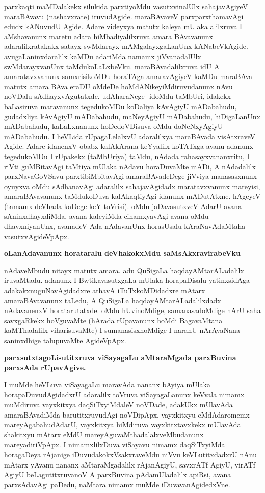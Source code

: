 \noindent
parxkaqti maMDalakekx silukida parxtiyoMdu vasutxvinalUlx sahajavAgiyeV maraBAvavu (nashavxrate) iru\-vudAgide. maraBAvaveV parxparxthamavAgi edudx kANuvudU Agide. Adare videyxya matutx kaleya mU\-laka alilx\-ruva I aMshavanunx maretu adara hiMbadi\-yalilxruva amara BAvavanunx adaralilxratakakx satayx\--swMdarayx-mAMgalayx\break\-gaLanUnx kANabeVkAgide. avugaLaninxdaralilx kaMDu adariMda namamx jiVvanadalUlx swMdarayx\-vanUnx taMdukoLaLxbeVku. maraBAvadalilxruva idU A amaratavxvanunx samxrisikoMDu hora\-TAga amaravAgiyeV kaMDu maraBAva matutx amara BAva eraDU oMdeDe hoMdANikeyiMdiruvu\-danunx nAvu noVDalu sAdhayxvAgutatxde. udAharaNege- idoMdu taMbUri, idakekx baLasiruva mara\-vanunx tegedukoMDu koDaliya kAvAgiyU mADabahudu, gudadxliya kAvAgiyU mADabahudu, maNeyAgiyU mADabahudu, hiDigaLanUnx mADabahudu, kaLaLxnanunx hoDe\-doVDisuva oMdu doNeNx\-yAgiyU mADabahudu. I heVLida rUpagaLelalxvU adaralilxya maraBAvada visAtxraveV Agide. Adare idanenxV obabx kalAkArana keYyalilx koTATxga avanu adanunx tegedukoMDu I rUpakekx (taMbU\-riya) taMdu, nAdada rahasayxvananxritu, I riVti guMBitavAgi taMtiya mUlaka nAdavu horaDuvaMte mADi, A nAdadalilx parxNavaGoVSavu parxtibiMbitavAgi amaraBAvadeDege jiVviya manasasxnunx oyuyxva oMdu sAdhanavAgi adaralilx sahajavAgidadx maratavxvanunx mareyisi, amaraBAvavanunx taMdukoDuva kalAkaqtiyAgi idanunx mADutAtxne. hAgeyeV (tamamx deVhada kaDege keY toVrisi). oMdu jaDavasutxveV AdarU avana sAninxdhayxdiMda, avana kaleyiMda cinamxyavAgi avana oMdu dhavxniyanUnx, avanadeV Ada nAdavanUnx horasUsalu kAraNavAdaMtaha vasutxvAgideVpApx.

{\bigskip
\noindent
{\large\bf oLanAdavanunx horataralu deVhakokxMdu saMsAkxravirabeVku}}\label{page130}
\medskip

\noindent
nAdaveMbudu nitayx matutx amara. adu QuSigaLa haqdayAMtarALadalilx iruvaMtadu. adanunx I BwtikavasutxgaLa mUlaka horapaDisalu yatinxsidAga adakakxnuguNavAgidadxre athavA iTuTxkoMDi\-dadxre mAtarx amaraBAvavanunx taLedu, A QuSigaLa haqdayAMtarALadalilxdadx nAdavanenxV horatarutatxde. oMdu hUvinoMdige, samanasadoMdige nArU saha savxgaRkekx hoVguvaMte (hArada rUpavanunx hoMdi BagavaMtana kaMThadalilx viharisuvaMte) I sumanasisxnoMdige I naranU nArAyaNana saninxdhige talupu\-vaMte AgideVpApx.

\newpage

{\bigskip
\noindent
{\large\bf parxsutxtagoLisutitxruva viSayagaLu aMtaraMgada parxBuvina parxsAda rUpa\-vAgive.}}
\medskip

\noindent
I muMde heVLuva viSayagaLu maravAda nananx bAyiya mUlaka hora\-paDuvudAgidadxrU adaralilx toVruva viSayagaLanunx keVvala nimamx muMdiruva \hbox{vayxkitxya} daqSiTxyiMdaleV noVDade, adakUkx mUlavAda amaraBAvadiMda baru\-titxruvudAgi noVDipApx. vayxkitxyu eMdAdaromemx mareyAgabahu\-dAdarU, vayxkitxya hiMdiruva vayxkitxtavxkekx mUlavAda shakitxyu mAtarx eMdU mareyAguvaMthadalalxveMbu\-danunx mareyadiriVpApx. I nimamxlilxDuva viSayavu nimamx daqSiTxyiMda horagaDeya rAjanige iDuvuda\-kokxVsakxraveMdu niVvu keVLutitxdadxrU nAnu mAtarx yAvanu nananx aMtaraMgadalilx rAja\-nAgiyU, savxrATf AgiyU, virATf AgiyU beLagutitxruvanoV A parxBuvina pAdamUladalilx apiRsi, avana parxsAda\-vAgi paDedu, naMtara nimamx muMde iDuvavanAgidedxVne.

